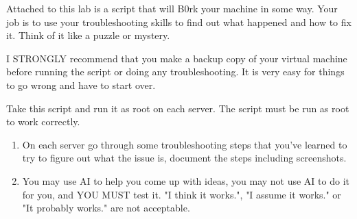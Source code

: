 \documentclass[12pt]{article}
\begin{document}
Attached to this lab is a script that will B0rk your machine in some way.  Your job is to use your troubleshooting skills to find out what happened and how to fix it.  Think of it like a puzzle or mystery. 

I STRONGLY recommend that you make a backup copy of your virtual machine before running the script or doing any troubleshooting.  It is very easy for things to go wrong and have to start over. 


Take this script and run it as root on each server. The script must be run as root to work correctly. 
  
    \begin{enumerate}
        \item On each server go through some troubleshooting steps that you've learned to try to figure out what the issue is, document the steps including screenshots. 
        \item  You may use AI to help you come up with ideas, you may not use AI to do it for you, and YOU MUST test it.  "I think it works.",  "I assume it works." or   "It probably works." are not acceptable.

    \end{enumerate}   
    
\end{document}
